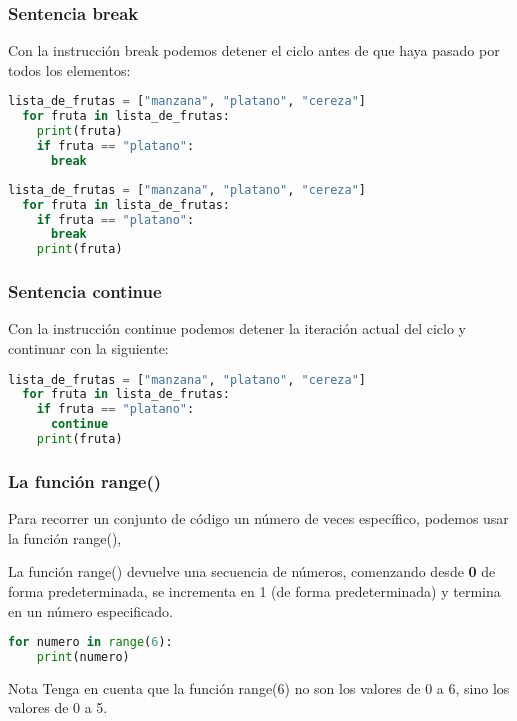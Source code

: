 \begin{frame}[fragile]
  \frametitle{Sentencia \textbf{break}}

  \vspace{\baselineskip}
  Con la instrucción \textcolor{codeKeyword}{break} podemos detener el ciclo
  antes de que haya pasado por todos los elementos:

  \vspace{\baselineskip}
  \begin{lstlisting}[language=Python]
  lista_de_frutas = ["manzana", "platano", "cereza"]
  for fruta in lista_de_frutas:
    print(fruta)
    if fruta == "platano":
      break
  \end{lstlisting}

  \pausa
  \begin{lstlisting}[language=Python]
  lista_de_frutas = ["manzana", "platano", "cereza"]
  for fruta in lista_de_frutas:
    if fruta == "platano":
      break
    print(fruta)
  \end{lstlisting}
\end{frame}

\begin{frame}[fragile]
  \frametitle{Sentencia \textbf{continue}}

  Con la instrucción \textcolor{codeKeyword}{continue} podemos detener
  la iteración actual del ciclo y continuar con la siguiente:

  \vspace{\baselineskip}
  \begin{lstlisting}[language=Python]
  lista_de_frutas = ["manzana", "platano", "cereza"]
  for fruta in lista_de_frutas:
    if fruta == "platano":
      continue
    print(fruta)
  \end{lstlisting}
\end{frame}

\begin{frame}[fragile]
  \frametitle{La función \textbf{range}()}

  Para recorrer un conjunto de código un número de veces específico,
  podemos usar la función \textcolor{codeKeyword2}{range}(),

  \vspace{\baselineskip}
  La función \textcolor{codeKeyword2}{range}() devuelve una secuencia
  de números, comenzando desde \textbf{0} de forma predeterminada,
  se incrementa en 1 (de forma predeterminada) y termina en un
  número especificado.

  \vspace{\baselineskip}
  \begin{lstlisting}[language=Python]
  for numero in range(6):
    print(numero)
  \end{lstlisting}

  \pausa
  \begin{alertblock}{Nota}
  Tenga en cuenta que la función range(6) no son los valores de 0 a 6,
  sino los valores de 0 a 5.
  \end{alertblock}
\end{frame}

